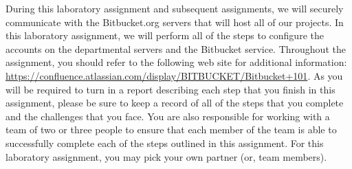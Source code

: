 During this laboratory assignment and subsequent assignments, we will securely communicate with the Bitbucket.org
servers that will host all of our projects.  In this laboratory assignment, we will perform all of the steps to
configure the accounts on the departmental servers and the Bitbucket service.  Throughout the assignment, you should
refer to the following web site for additional information:
\url{https://confluence.atlassian.com/display/BITBUCKET/Bitbucket+101}.  As you will be required to turn in a report
describing each step that you finish in this assignment, please be sure to keep a record of all of the steps that you
complete and the challenges that you face.  You are also responsible for working with a team of two or three people to
ensure that each member of the team is able to successfully complete each of the steps outlined in this assignment. For
this laboratory assignment, you may pick your own partner (or, team members).

